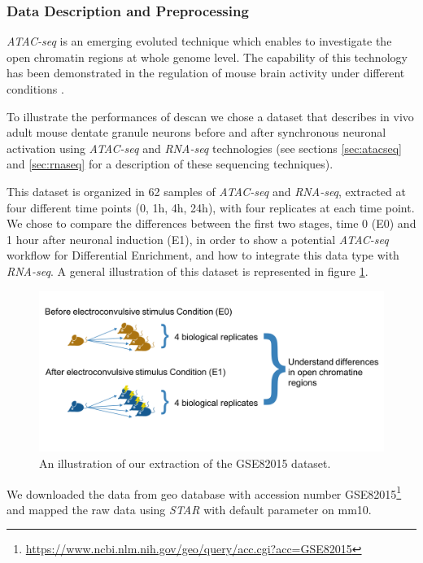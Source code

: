 \subsubsection{Data Description and Preprocessing}
\textit{ATAC-seq} is an emerging evoluted technique which enables to investigate the open chromatin regions at whole genome level.
The capability of this technology has been demonstrated in the regulation of mouse brain activity under different conditions \cite{Su2017}.

To illustrate the performances of \gls{descan} we chose a dataset \cite{Su2017} that describes in vivo adult mouse dentate granule neurons before and after synchronous neuronal activation using \textit{ATAC-seq} and \textit{RNA-seq} technologies (see sections \ref{sec:atacseq} and \ref{sec:rnaseq} for a description of these sequencing techniques).

This dataset is organized in 62 samples of \textit{ATAC-seq} and \textit{RNA-seq}, extracted at four different time points (0, 1h, 4h, 24h), with four replicates at each time point.
We chose to compare the differences between the first two stages, time 0 (E0) and 1 hour after neuronal induction (E1), in order to show a potential \textit{ATAC-seq} workflow for Differential Enrichment, and how to integrate this data type with \textit{RNA-seq}. A general illustration of this dataset is represented in figure \ref{fig:atacdataset}.

\begin{figure}[H]
\includegraphics[width=\textwidth, keepaspectratio]{img/descan2/dataset.png}
\caption[DEScan2 dataset illustration]{An illustration of our extraction of the GSE82015\cite{Su2017} dataset.}
\label{fig:atacdataset}
\centering
\end{figure}

We downloaded the data from \gls{geo} database \cite{Edgar2002, Barrett2013} with accession number GSE82015\footnote{\url{https://www.ncbi.nlm.nih.gov/geo/query/acc.cgi?acc=GSE82015}} and mapped the raw data using \textit{STAR} \cite{Dobin2013} with default parameter on \gls{mm10}.

